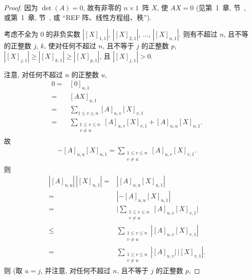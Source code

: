 \documentclass[../libro.tex]{subfiles}
\begin{document}
\begin{proof}
    因为 \(\det {(A)} = 0\),
    故有非零的 \(n \times 1\)~阵 \(X\),
    使 \(A X = 0\)
    (见第~1~章, 节~, %
    或第~1~章, 节~,
    或 ``REF 阵、线性方程组、秩''). %

    考虑不全为 \(0\) 的非负实数
    \(|[X]_{1,1}|\), \(|[X]_{2,1}|\), \(\dots\), \(|[X]_{n,1}|\).
    则有不超过 \(n\), 且不等的正整数 \(j\), \(k\),
    使对任何不超过 \(n\), 且不等于 \(j\) 的正整数 \(p\),
    \(|[X]_{j,1}| \geq |[X]_{k,1}| \geq |[X]_{p,1}|\),
    且 \(|[X]_{j,1}| > 0\).

    注意, 对任何不超过 \(n\) 的正整数 \(u\),
    \begin{align*}
        0
        = {} &
        [0]_{u,1}
        \\
        = {} &
        [A X]_{u,1}
        \\
        = {} &
        \sum_{1 \leq v \leq n}
        {[A]_{u,v} [X]_{v,1}}
        \\
        = {} &
        \sum_{\substack{1 \leq v \leq n \\ v \neq u}}
        {[A]_{u,v} [X]_{v,1}}
        + [A]_{u,u} [X]_{u,1}.
    \end{align*}
    故
    \begin{align*}
        -[A]_{u,u} [X]_{u,1}
        = \sum_{\substack{1 \leq v \leq n \\ v \neq u}}
        {[A]_{u,v} [X]_{v,1}}.
    \end{align*}
    则
    \begin{align*}
        |[A]_{u,u}|\, |[X]_{u,1}|
        = {} &
        |{[A]_{u,u} [X]_{u,1}}|
        \\
        = {} &
        |{-[A]_{u,u} [X]_{u,1}}|
        \\
        = {} &
        \Bigg|
        \sum_{\substack{1 \leq v \leq n \\ v \neq u}}
        {[A]_{u,v} [X]_{v,1}}
        \Bigg|
        \\
        \leq {} &
        \sum_{\substack{1 \leq v \leq n \\ v \neq u}}
        {|{[A]_{u,v} [X]_{v,1}}|}
        \\
        = {} &
        \sum_{\substack{1 \leq v \leq n \\ v \neq u}}
        {|{[A]_{u,v}|\, |[X]_{v,1}}|}.
    \end{align*}
    则
    (取 \(u = j\), %
    并注意, 对任何不超过 \(n\), 且不等于 \(j\) 的正整数 \(p\),

\end{proof}
\end{document}
